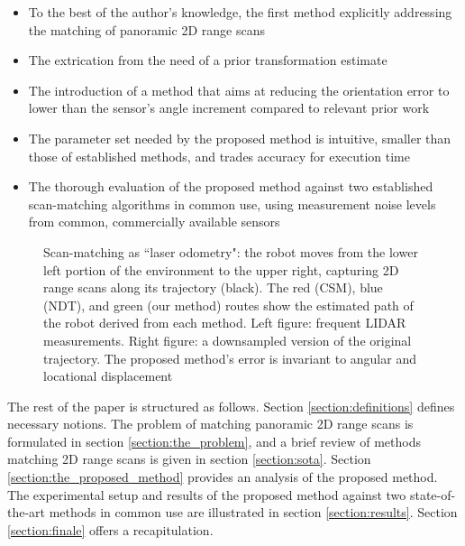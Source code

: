\begin{itemize}
  \item To the best of the author's knowledge, the first method explicitly
        addressing the matching of panoramic 2D range scans
  \item The extrication from the need of a prior transformation estimate
  \item The introduction of a method that aims at reducing the orientation
        error to lower than the sensor's angle increment compared to relevant
        prior work
  \item The parameter set needed by the proposed method is intuitive, smaller
        than those of established methods, and trades accuracy for execution
        time
  \item The thorough evaluation of the proposed method against two established
        scan-matching algorithms in common use, using measurement noise levels
        from common, commercially available sensors
\end{itemize}

\begin{figure}[]\centering
  \vspace{-1.7cm}
  
  \vspace{-2.3cm}
  \caption{\small Scan-matching as ``laser odometry": the robot moves from the
           lower left portion of the environment to the upper right, capturing
           2D range scans along its trajectory (black). The red (CSM), blue
           (NDT), and green (our method) routes show the estimated path of the
           robot derived from each method. Left figure: frequent LIDAR
           measurements.  Right figure: a downsampled version of the original
           trajectory. The proposed method's error is invariant to angular and
           locational displacement}
  \label{fig:laser_odometry}
\end{figure}

The rest of the paper is structured as follows. Section
\ref{section:definitions} defines necessary notions.  The problem of matching
panoramic 2D range scans is formulated in section \ref{section:the_problem},
and a brief review of methods matching 2D range scans is given in section
\ref{section:sota}. Section \ref{section:the_proposed_method} provides an
analysis of the proposed method. The experimental setup and results of the
proposed method against two state-of-the-art methods in common use are
illustrated in section \ref{section:results}. Section \ref{section:finale}
offers a recapitulation.
